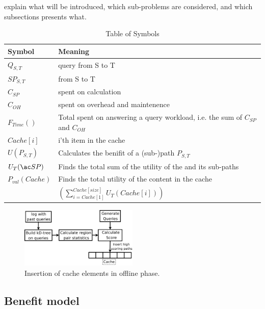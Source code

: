 explain what will be introduced, which sub-problems are considered, and which subsections presents what.


\begin{table}
\begin{tabular*}{\columnwidth}{|l||p{}|}
\hline
\bf Symbol		& \bf Meaning \\\hline
$Q_{S,T}$		& \spath query from S to T \\\hline
$SP_{S,T}$		& \spath from S to T \\\hline
$C_{SP}$		& \cet spent on \spath calculation \\\hline
$C_{OH}$		& \cet spent on overhead and maintenence \\\hline
$F_{Time}()$		& Total \cet spent on answering a query workload, i.e. the sum of  $C_{SP}$ and $C_{OH}$\\\hline
$Cache[i]$		& i'th item in the cache \\\hline
$U(P_{S,T})$		& Calculates the benifit of a (sub-)path $P_{S,T}$ \\\hline
$U_T(\spath)$		& Finds the total sum of the utility of the \spath and its sub-paths \\\hline
$P_{val}(Cache)$	& Finds the total utility of the content in the cache \\ 
			& $\left(\sum\limits_{i=Cache[1]}^{Cache[size]} U_T\left(Cache[i]\right)\right)$ \\\hline

\end{tabular*}
\caption{Table of Symbols}
\label{tab:symbols}
\end{table}


\begin{figure}[bht]
  \center
        \includegraphics[width=0.5\textwidth]{figures/fillcache}
        \caption{Insertion of cache elements in offline phase.}
  \label{fig:fillcache}
\end{figure}


\subsection{Benefit model}

